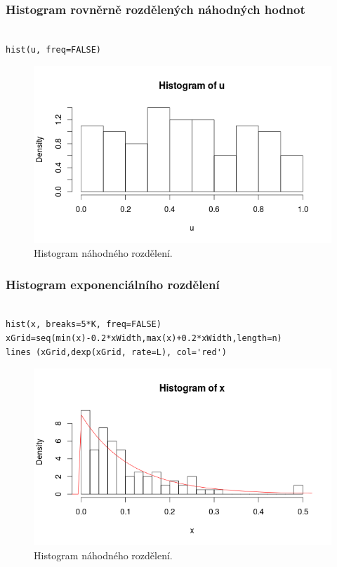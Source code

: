 \documentclass[12pt]{article}
\begin{document}
\subsubsection{Histogram rovněrně rozdělených náhodných hodnot}
\begin{lstlisting}[frame=single]  % Start your code-block
    
hist(u, freq=FALSE)
\end{lstlisting}
\begin{figure}[h!t]
	\includegraphics[scale=0.5]{img/histogram_u}\centering
	\caption{Histogram náhodného rozdělení.}
	\label{obr:sikme}
\end{figure}

\subsubsection{Histogram exponenciálního rozdělení}
  \begin{lstlisting}[frame=single]  % Start your code-block
  	
hist(x, breaks=5*K, freq=FALSE)
xGrid=seq(min(x)-0.2*xWidth,max(x)+0.2*xWidth,length=n) 
lines (xGrid,dexp(xGrid, rate=L), col='red') 
\end{lstlisting}
\begin{figure}[ht!]
	\includegraphics[scale=0.5]{img/histogram_x}\centering
	\caption{Histogram náhodného rozdělení.}
	\label{obr:sikme}
\end{figure}
\end{document}
